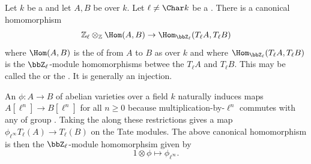 \begin{definition} \label{definition:ell_adic_representation_map_from_base_change_of_isogenies_of_abelian_varieties_to_hom_set_of_tate_modules}
    Let $k$ be a  and let $A, B$ be  over $k$. Let $\ell \neq \Char k$ be a .
    There is a canonical homomorphism
    $$\mathbb{Z}_\ell \otimes_{\mathbb{Z}} \Hom(A, B) \to \Hom_{\bbZ_\ell}(T_\ell A, T_\ell B)$$
    where $\Hom(A, B)$ is the  of  from $A$ to $B$ as  over $k$ and where $\Hom_{\bbZ_\ell}(T_\ell A, T_\ell B)$ is the $\bbZ_\ell$-module homomorphisms betwee the  $T_\ell A$ and $T_\ell B$. This may be called the  or the . It is generally an injection.

    An  $\phi: A \to B$ of abelian varieties over a field $k$ naturally induces maps $A[\ell^n] \to B[\ell^n]$ for all $n \geq 0$ because multiplication-by-$\ell^n$ commutes with any  of group . Taking the  along these restrictions gives a map $\phi_{\ell^\infty} T_\ell(A) \to T_\ell(B)$ on the Tate modules. The above canonical homomorphism is then the $\bbZ_\ell$-module homomorphsim given by 
    $$1 \otimes \phi \mapsto \phi_{\ell^\infty}.$$
\end{definition}
